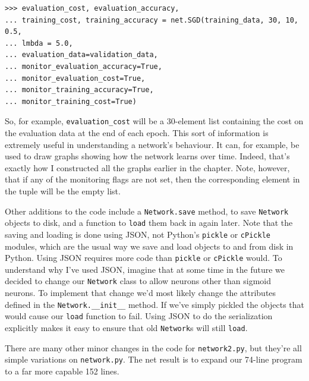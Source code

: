 \begin{lstlisting}
>>> evaluation_cost, evaluation_accuracy, 
... training_cost, training_accuracy = net.SGD(training_data, 30, 10, 0.5,
... lmbda = 5.0,
... evaluation_data=validation_data,
... monitor_evaluation_accuracy=True,
... monitor_evaluation_cost=True,
... monitor_training_accuracy=True,
... monitor_training_cost=True)

\end{lstlisting}


So, for example, \texttt{evaluation\_\allowbreak{}cost} will be a 30-element list containing the cost on the evaluation data at the end of each epoch. This sort of information is extremely useful in understanding a network's behaviour. It can, for example, be used to draw graphs showing how the network learns over time. Indeed, that's exactly how I constructed all the graphs earlier in the chapter. Note, however, that if any of the monitoring flags are not set, then the corresponding element in the tuple will be the empty list.


Other additions to the code include a \texttt{Network.save} method, to save \texttt{Network} objects to disk, and a function to \texttt{load} them back in again later. Note that the saving and loading is done using JSON, not Python's \texttt{pickle} or \texttt{cPickle} modules, which are the usual way we save and load objects to and from disk in Python. Using JSON requires more code than \texttt{pickle} or \texttt{cPickle} would. To understand why I've used JSON, imagine that at some time in the future we decided to change our \texttt{Network} class to allow neurons other than sigmoid neurons. To implement that change we'd most likely change the attributes defined in the \texttt{Network.\_\allowbreak{}\_\allowbreak{}init\_\allowbreak{}\_\allowbreak{}} method. If we've simply pickled the objects that would cause our \texttt{load} function to fail. Using JSON to do the serialization explicitly makes it easy to ensure that old \texttt{Network}s will still \texttt{load}.


There are many other minor changes in the code for \texttt{network2.py}, but they're all simple variations on \texttt{network.py}. The net result is to expand our 74-line program to a far more capable 152 lines.



